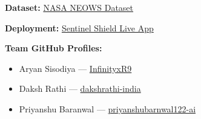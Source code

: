 \documentclass[11pt,a4paper]{article}
\begin{document}
\textbf{Dataset:}
\href{https://drive.google.com/file/d/1BN6ro6Qtfd4j7tUtlrgVzZ_Ts3axj6v0/view}{NASA NEOWS Dataset}

\textbf{Deployment:}
\href{https://spacecode-ps3.streamlit.app/}{Sentinel Shield Live App}

\textbf{Team GitHub Profiles:}
\begin{itemize}
\item Aryan Sisodiya — \href{https://github.com/InfinityxR9}{InfinityxR9}
\item Daksh Rathi — \href{https://github.com/dakshrathi-india}{dakshrathi-india}
\item Priyanshu Baranwal — \href{https://github.com/priyanshubarnwal122-ai}{priyanshubarnwal122-ai}
\end{itemize}
\end{document}

